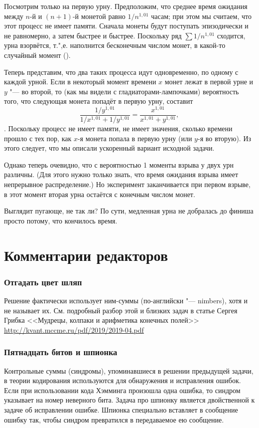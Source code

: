 \documentclass[twoside]{book}
\begin{document}

Посмотрим только на первую урну.
Предположим, что среднее время ожидания между $n$-й и $(n+1)$-й монетой равно 
$1/n^{1{,}01}$ часам; при этом мы считаем, что этот процесс не имеет памяти.
Сначала монеты будут поступать эпизодически и не равномерно, а затем быстрее и быстрее.
Поскольку ряд $\sum 1/n^{1{,}01}$ сходится, урна взорвётся, т.",е. наполнится бесконечным числом монет, в какой-то случайный момент ().

Теперь представим, что два таких процесса идут одновременно, по одному с каждой урной.
Если в некоторый момент времени $x$ монет лежат в первой урне и $y$ "--- во второй, то (как мы видели с гладиаторами-лампочками) 
вероятность того, что следующая монета попадёт в первую урну, составит
\[\frac{1/y^{1{,}01}}{1/x^{1{,}01}+1/y^{1{,}01}}=\frac{x^{1{,}01}}{x^{1{,}01}+y^{1{,}01}},\]
.
Поскольку процесс не имеет памяти,
не имеет значения, сколько времени прошло с тех пор, как $x$-я монета попала в первую урну (или $y$-я во вторую).
Из этого следует, что мы описали ускоренный вариант исходной задачи.

Однако теперь очевидно, что с вероятностью 1 моменты взрыва у двух урн различны.
(Для этого нужно только знать, что время ожидания взрыва имеет непрерывное распределение.)
Но эксперимент заканчивается при первом взрыве, в этот момент вторая урна остаётся с конечным числом монет.\heart

Выглядит пугающе, не так ли?
По сути, медленная урна не добралась до финиша просто потому, что кончилось время.

\section*{Комментарии редакторов}

\subsubsection*{Отгадать цвет шляп}
Решение фактически использует ним-суммы (по-английски "--- nimbers), хотя и не называет их.
См. подробный разбор этой и близких задач в статье Сергея Грибка <<Мудрецы, колпаки и арифметика конечных полей>> 
\url{http://kvant.mccme.ru/pdf/2019/2019-04.pdf}

\subsubsection{Пятнадцать битов и шпионка}
Контрольные суммы (синдромы), упоминавшиеся  в решении предыдущей задачи, в теории кодирования используются для обнаружения и исправления ошибок. Если при использовании кода Хэмминга произошла одна ошибка, то синдром указывает на номер неверного бита. Задача про шпионку является двойственной к задаче об исправлении ошибке. Шпионка специально вставляет в сообщение ошибку так, чтобы синдром превратился в передаваемое ею сообщение.
\end{document}
